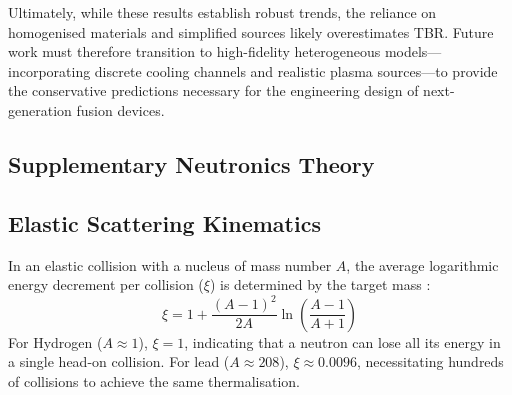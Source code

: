 \documentclass[12pt]{article}
\begin{document}
Ultimately, while these results establish robust trends, the reliance on homogenised materials and
simplified sources likely overestimates TBR. Future work must therefore transition to high-fidelity
heterogeneous models—incorporating discrete cooling channels and realistic plasma sources—to provide
the conservative predictions necessary for the engineering design of next-generation fusion devices.


% 
% 

\printbibliography[heading=bibintoc, title={References}, prenote=bibnote] %




\newpage
\begin{appendices}



\section{Supplementary Neutronics Theory} \label{app:neutronics_theory}

\subsection{Elastic Scattering Kinematics}
In an elastic collision with a nucleus of mass number $A$, the average logarithmic energy decrement
per collision ($\xi$) is determined by the target mass \cite{nuclearphysics}:
\begin{equation}
    \xi = 1 + \frac{(A-1)^2}{2A} \ln \left( \frac{A-1}{A+1} \right)
\end{equation}
For Hydrogen ($A \approx 1$), $\xi = 1$, indicating that a neutron can lose all its energy in a
single head-on collision. For lead ($A \approx 208$), $\xi \approx 0.0096$, necessitating hundreds
of collisions to achieve the same thermalisation.


\end{appendices}


\end{document}
